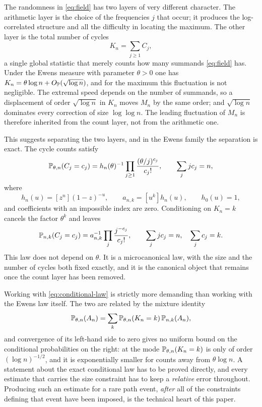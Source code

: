 \documentclass[11pt]{article}
\theoremstyle{definition}\newtheorem{definition}[theorem]{Definition}
\theoremstyle{remark}\newtheorem{remark}[theorem]{Remark}
\newcommand{\Op}{O_{\Pp}}\newcommand{\eps}{\varepsilon}
\numberwithin{equation}{section}\allowdisplaybreaks
\begin{document}
The randomness in \eqref{eq:field} has two layers of very different
character. The arithmetic layer is the choice of the frequencies $j$
that occur; it produces the log-correlated structure and all the
difficulty in locating the maximum. The other layer is the total number
of cycles
\[
 K_n=\sum_{j\ge1}C_j,
\]
a single global statistic that merely counts how many summands
\eqref{eq:field} has. Under the Ewens measure with parameter $\theta>0$
one has $K_n=\theta\log n+\Op(\sqrt{\log n})$, and for the maximum this
fluctuation is not negligible. The extremal speed depends on the number
of summands, so a displacement of order $\sqrt{\log n}$ in $K_n$ moves
$M_n$ by the same order; and $\sqrt{\log n}$ dominates every correction
of size $\log\log n$. The leading fluctuation of $M_n$ is therefore
inherited from the count layer, not from the arithmetic one.

This suggests separating the two layers, and in the Ewens family the
separation is exact. The cycle counts satisfy
\[
 \mathbb P_{\theta,n}(C_j=c_j)=h_n(\theta)^{-1}
       \prod_{j\ge1}\frac{(\theta/j)^{c_j}}{c_j!},
 \qquad\sum_jjc_j=n,
\]
where
\begin{equation}\label{eq:basic-coeff}
 h_n(u)=[z^n](1-z)^{-u},\qquad a_{n,k}=[u^k]h_n(u),
 \qquad h_0(u)=1,
\end{equation}
and coefficients with an impossible index are zero. Conditioning on
$K_n=k$ cancels the factor $\theta^k$ and leaves
\begin{equation}\label{eq:conditional-law}
 \mathbb P_{n,k}(C_j=c_j)=a_{n,k}^{-1}
       \prod_j\frac{j^{-c_j}}{c_j!},
 \qquad\sum_jjc_j=n,\quad\sum_jc_j=k.
\end{equation}
This law does not depend on $\theta$. It is a microcanonical law, with
the size and the number of cycles both fixed exactly, and it is the
canonical object that remains once the count layer has been removed.

Working with \eqref{eq:conditional-law} is strictly more demanding than
working with the Ewens law itself. The two are related by the mixture
identity
\begin{equation}\label{eq:mixture}
 \mathbb P_{\theta,n}(A_n)=\sum_k\mathbb P_{\theta,n}(K_n=k)\,\mathbb P_{n,k}(A_n),
\end{equation}
and convergence of its left-hand side to zero gives no uniform bound on
the conditional probabilities on the right: at the mode
$\mathbb P_{\theta,n}(K_n=k)$ is only of order $(\log n)^{-1/2}$, and it is
exponentially smaller for counts away from $\theta\log n$. A statement
about the exact conditional law has to be proved directly, and every
estimate that carries the size constraint has to keep a \emph{relative}
error throughout. Producing such an estimate for a rare path event,
\emph{after} all of the constraints defining that event have been
imposed, is the technical heart of this paper.
\end{document}
